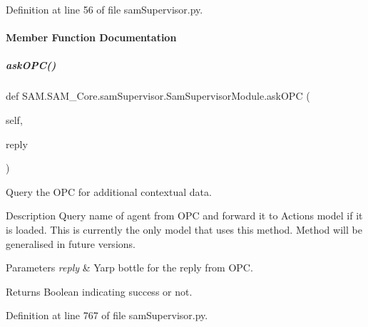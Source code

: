 Definition at line 56 of file sam\+Supervisor.\+py.



\paragraph{Member Function Documentation}
\mbox{\label{group__icubclient__SAM__Core_a1d60fc35cdd1c4bc9127dbf2958ebe1c}} 
\subparagraph{\texorpdfstring{ask\+O\+P\+C()}{askOPC()}}
{\footnotesize\ttfamily def S\+A\+M.\+S\+A\+M\+\_\+\+Core.\+sam\+Supervisor.\+Sam\+Supervisor\+Module.\+ask\+O\+PC (\begin{DoxyParamCaption}\item[{}]{self,  }\item[{}]{reply }\end{DoxyParamCaption})}



Query the O\+PC for additional contextual data. 

\begin{DoxyParagraph}{Description}
Query name of agent from O\+PC and forward it to Actions model if it is loaded. This is currently the only model that uses this method. Method will be generalised in future versions.
\end{DoxyParagraph}

\begin{DoxyParams}{Parameters}
{\em reply} & Yarp bottle for the reply from O\+PC.\\
\hline
\end{DoxyParams}
\begin{DoxyParagraph}{Returns}
Boolean indicating success or not. 
\end{DoxyParagraph}


Definition at line 767 of file sam\+Supervisor.\+py.

